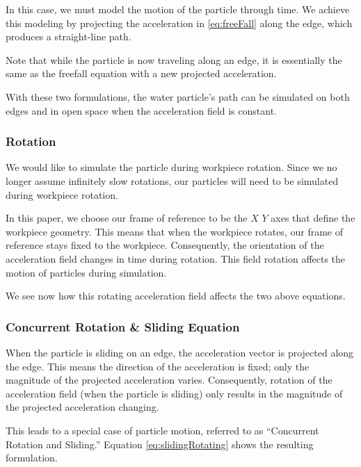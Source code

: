 In this case, we must model the motion of the particle through time. We achieve this modeling by projecting the acceleration in \eqref{eq:freeFall} along the edge, which produces a straight-line path.

Note that while the particle is now traveling along an edge, it is essentially the same as the freefall equation with a new projected acceleration.



With these two formulations, the water particle's path can be simulated on both edges and in open space when the acceleration field is constant.

		\subsubsection{Rotation}

We would like to simulate the particle during workpiece rotation. Since we no longer assume infinitely slow rotations, our particles will need to be simulated during workpiece rotation.

In this paper, we choose our frame of reference to be the $X$ $Y$ axes that define the workpiece geometry. This means that when the workpiece rotates, our frame of reference stays fixed to the workpiece. Consequently, the orientation of the acceleration field changes in time during rotation. This field rotation affects the motion of particles during simulation.

We see now how this rotating acceleration field affects the two above equations.

		\subsubsection{Concurrent Rotation \& Sliding Equation}

When the particle is sliding on an edge, the acceleration vector is projected along the edge. This means the direction of the acceleration is fixed; only the magnitude of the projected acceleration varies. Consequently, rotation of the acceleration field (when the particle is sliding) only results in the magnitude of the projected acceleration changing.

This leads to a special case of particle motion, referred to as ``Concurrent Rotation and Sliding.'' Equation \eqref{eq:slidingRotating} shows the resulting formulation.

